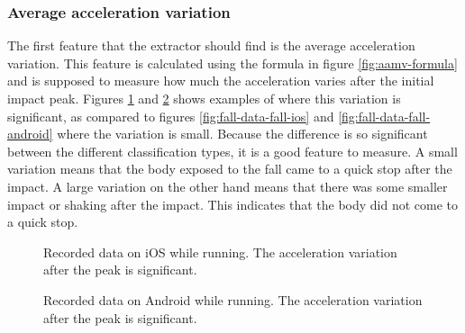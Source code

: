 \documentclass[12pt, a4paper, onecolumn]{article}
\begin{document}
	\subsubsection{Average acceleration variation}
	
	The first feature that the extractor should find is the average acceleration variation. This feature is calculated using the formula in figure \ref{fig:aamv-formula} and is supposed to measure how much the acceleration varies after the initial impact peak. Figures \ref{fig:fall-data-run-ios} and \ref{fig:fall-data-run-android} shows examples of where this variation is significant, as compared to figures \ref{fig:fall-data-fall-ios} and \ref{fig:fall-data-fall-android} where the variation is small. Because the difference is so significant between the different classification types, it is a good feature to measure. A small variation means that the body exposed to the fall came to a quick stop after the impact. A large variation on the other hand means that there was some smaller impact or shaking after the impact. This indicates that the body did not come to a quick stop.
	
	\begin{figure}[H]
		\centering
		\caption{Recorded data on iOS while running. The acceleration variation after the peak is significant.}%
		\label{fig:fall-data-run-ios}%
	\end{figure}
	
	\begin{figure}[H]
		\centering
		\caption{Recorded data on Android while running. The acceleration variation after the peak is significant.}%
		\label{fig:fall-data-run-android}%
	\end{figure}
	
\end{document}
